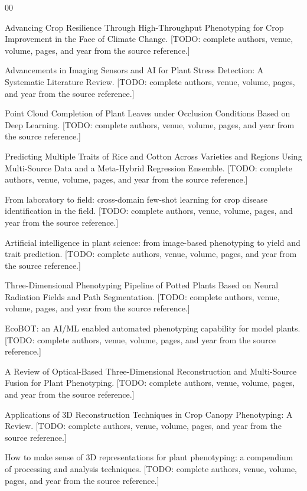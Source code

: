 \documentclass[preprint,12pt]{elsarticle}
\begin{document}
\begin{thebibliography}{00}

 Advancing Crop Resilience Through High-Throughput Phenotyping for Crop Improvement in the Face of Climate Change. [TODO: complete authors, venue, volume, pages, and year from the source reference.]

 Advancements in Imaging Sensors and AI for Plant Stress Detection: A Systematic Literature Review. [TODO: complete authors, venue, volume, pages, and year from the source reference.]

 Point Cloud Completion of Plant Leaves under Occlusion Conditions Based on Deep Learning. [TODO: complete authors, venue, volume, pages, and year from the source reference.]

 Predicting Multiple Traits of Rice and Cotton Across Varieties and Regions Using Multi-Source Data and a Meta-Hybrid Regression Ensemble. [TODO: complete authors, venue, volume, pages, and year from the source reference.]

 From laboratory to field: cross-domain few-shot learning for crop disease identification in the field. [TODO: complete authors, venue, volume, pages, and year from the source reference.]

 Artificial intelligence in plant science: from image-based phenotyping to yield and trait prediction. [TODO: complete authors, venue, volume, pages, and year from the source reference.]

 Three-Dimensional Phenotyping Pipeline of Potted Plants Based on Neural Radiation Fields and Path Segmentation. [TODO: complete authors, venue, volume, pages, and year from the source reference.]

 EcoBOT: an AI/ML enabled automated phenotyping capability for model plants. [TODO: complete authors, venue, volume, pages, and year from the source reference.]

 A Review of Optical-Based Three-Dimensional Reconstruction and Multi-Source Fusion for Plant Phenotyping. [TODO: complete authors, venue, volume, pages, and year from the source reference.]

 Applications of 3D Reconstruction Techniques in Crop Canopy Phenotyping: A Review. [TODO: complete authors, venue, volume, pages, and year from the source reference.]

 How to make sense of 3D representations for plant phenotyping: a compendium of processing and analysis techniques. [TODO: complete authors, venue, volume, pages, and year from the source reference.]


\end{thebibliography}
\end{document}
